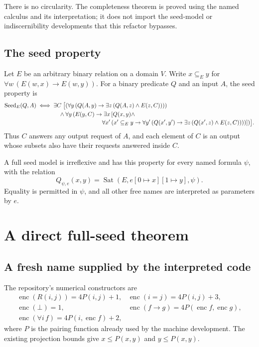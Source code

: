 \documentclass[11pt,letterpaper]{article}
\theoremstyle{definition}
\theoremstyle{remark}
\newcommand{\enc}{\operatorname{enc}}
\newcommand{\Sat}{\operatorname{Sat}}
\newcommand{\Seed}{\operatorname{Seed}}
\begin{document}
There is no circularity. The completeness theorem is proved using the named
calculus and its interpretation; it does not import the seed-model or
indiscernibility developments that this refactor bypasses.

\subsection{The seed property}

Let \(E\) be an arbitrary binary relation on a domain \(V\). Write \(x\subseteq_E y\)
for \(\forall w\,(E(w,x)\to E(w,y))\). For a binary predicate \(Q\) and an input
\(A\), the seed property is
\begin{align*}
\Seed_E(Q,A)\;\Longleftrightarrow\;\exists C\;\bigl[&
  (\forall y\,(Q(A,y)\to\exists z\,(Q(A,z)\land E(z,C))))\\
  {}\land{}&\forall y\,(E(y,C)\to\exists x\,[Q(x,y)\land\\[-2pt]
  &\hspace{22mm}\forall x'\,(x'\subseteq_E y\to
       \forall y'\,(Q(x',y')\to\exists z\,(Q(x',z)\land E(z,C))))])\bigr].
\end{align*}
Thus \(C\) answers any output request of \(A\), and each element of \(C\) is an
output whose subsets also have their requests answered inside \(C\).

A full seed model is irreflexive and has this property for every named formula
\(\psi\), with the relation
\[
  Q_{\psi,e}(x,y)=\Sat(E,e[0\mapsto x][1\mapsto y],\psi).
\]
Equality is permitted in \(\psi\), and all other free names are interpreted as
parameters by \(e\).

\section{A direct full-seed theorem}

\subsection{A fresh name supplied by the interpreted code}

The repository's numerical constructors are
\[
\begin{array}{ll}
  \enc(R(i,j))=4P(i,j)+1,&\enc(i=j)=4P(i,j)+3,\\
  \enc(\bot)=1,&\enc(f\to g)=4P(\enc f,\enc g),\\
  \enc(\forall i\,f)=4P(i,\enc f)+2,
\end{array}
\]
where \(P\) is the pairing function already used by the machine development.
The existing projection bounds give \(x\le P(x,y)\) and \(y\le P(x,y)\).
\end{document}
